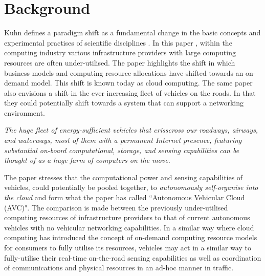 \section{Background}
Kuhn defines a paradigm shift as a fundamental change in the basic concepts and experimental practises of scientific disciplines \citep{Kuhn1970TheRevolutions}. In this paper \citep{Eltoweissy2010TowardsPaper}, within the computing industry various infrastructure providers with large computing resources are often under-utilised. The paper highlights the shift in which business models and computing resource allocations have shifted towards an on-demand model. This shift is known today as cloud computing. The same paper also envisions a shift in the ever increasing fleet of vehicles on the roads. In that they could potentially shift towards a system that can support a networking environment.

\begin{displayquote}
    \textit{The huge fleet of energy-sufficient vehicles that crisscross our roadways, airways, and waterways, most of them with a permanent Internet presence, featuring substantial on-board computational, storage, and sensing capabilities can be thought of as a huge farm of computers on the move.}
\end{displayquote}

The paper stresses that the computational power and sensing capabilities of vehicles, could potentially be pooled together, to \textit{autonomously self-organise into the cloud} and form what the paper has called ``Autonomous Vehicular Cloud (AVC)". The comparison is made between the previously under-utilised computing resources of infrastructure providers to that of current autonomous vehicles with no vehicular networking capabilities. In a similar way where cloud computing has introduced the concept of on-demand computing resource models for consumers to fully utilise its resources, vehicles may act in a similar way to fully-utilise their real-time on-the-road sensing capabilities as well as coordination of communications and physical resources in an ad-hoc manner in traffic.